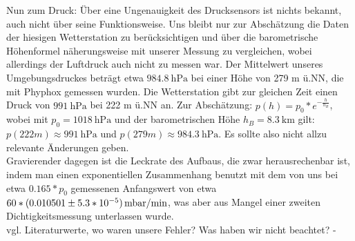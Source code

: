 \documentclass[]{article}
\begin{document}
	Nun zum Druck: Über eine Ungenauigkeit des Drucksensors ist nichts bekannt, auch nicht über seine Funktionsweise. Uns bleibt nur zur Abschätzung die Daten der hiesigen Wetterstation zu berücksichtigen und über die barometrische Höhenformel näherungsweise mit unserer Messung zu vergleichen, wobei allerdings der Luftdruck auch nicht zu messen war. Der Mittelwert unseres Umgebungsdruckes beträgt etwa $\SI{984.8}{\hecto \pascal}$ bei einer Höhe von 279 m ü.NN, die mit Phyphox gemessen wurden. Die Wetterstation gibt zur gleichen Zeit einen Druck von $\SI{991}{\hecto \pascal}$ bei 222 m ü.NN an. Zur Abschätzung: $p(h)=p_0*e^{-\frac{h}{h_B}}$, wobei mit $p_0=\SI{1018}{\hecto \pascal}$ und der barometrischen Höhe $h_B=\SI{8.3}{\kilo \meter}$ gilt: $p(222m) \approx \SI{991}{\hecto \pascal}$ und $p(279m) \approx \SI{984.3}{\hecto \pascal}$. Es sollte also nicht allzu relevante Änderungen geben.\\
	Gravierender dagegen ist die Leckrate des Aufbaus, die zwar herausrechenbar ist, indem man einen exponentiellen Zusammenhang benutzt mit dem von uns bei etwa $0.165*p_0$ gemessenen Anfangswert von etwa $60*(0.010501 \pm 5.3*10^{-5})\SI{}{ \, \milli \bar /{\minute}}$, was aber aus Mangel einer zweiten Dichtigkeitsmessung unterlassen wurde. \\
	{\color{red}vgl. Literaturwerte, wo waren unsere Fehler? Was haben wir nicht beachtet? - }
\end{document}
